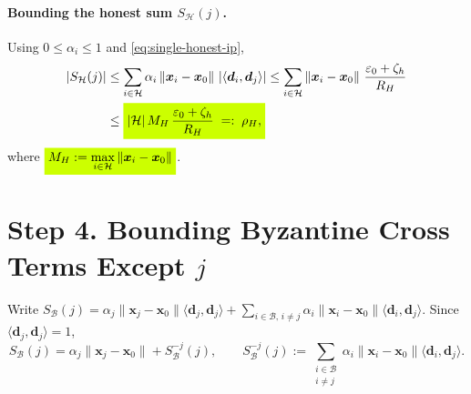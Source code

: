 \documentclass{article}
\theoremstyle{plain}
\theoremstyle{definition}
\theoremstyle{remark}
\begin{document}
\paragraph{Bounding the honest sum \(S_{\mathcal{H}}(j)\).}
Using $0\le \alpha_i\le 1$ and \eqref{eq:single-honest-ip},
\begin{align}
|S_{\mathcal{H}}(j)|
&\le \sum_{i\in \mathcal{H}} \alpha_i\,\|\bm{x}_i-\bm{x}_0\|\ |\langle \bm{d}_i,\bm{d}_j\rangle|
\le \sum_{i\in \mathcal{H}} \|\bm{x}_i-\bm{x}_0\|\ \frac{\varepsilon_0+\zeta_h}{R_H}
\nonumber\\
&\le 
  \colorbox{fluor}{%
    $\displaystyle
        |\mathcal{H}|\, M_H \,\frac{\varepsilon_0+\zeta_h}{R_H}
        \;=:\; \rho_H,
    $%
  }
\label{eq:SH-bound}
\end{align}
where
$
  \colorbox{fluor}{%
    $\displaystyle
        M_H:=\max_{i\in \mathcal{H}}\|\bm{x}_i-\bm{x}_0\|
    $%
  }
$.

\bigskip

\section*{Step 4. Bounding Byzantine Cross Terms Except \(j\)}

Write $S_{\mathcal{B}}(j)=\alpha_j\|\bm{x}_j-\bm{x}_0\|\langle \bm{d}_j,\bm{d}_j\rangle + \sum_{i\in \mathcal{B},\,i\ne j}\alpha_i\|\bm{x}_i-\bm{x}_0\|\langle \bm{d}_i,\bm{d}_j\rangle$.
Since $\langle \bm{d}_j,\bm{d}_j\rangle=1$,
\begin{equation}
S_{\mathcal{B}}(j)=\alpha_j\|\bm{x}_j-\bm{x}_0\| + S_{\mathcal{B}}^{-j}(j),
\qquad
S_{\mathcal{B}}^{-j}(j):=\sum_{\substack{i\in \mathcal{B}\\ i\ne j}}\alpha_i\|\bm{x}_i-\bm{x}_0\|\langle \bm{d}_i,\bm{d}_j\rangle.
\label{eq:SB-split}
\end{equation}
\end{document}
